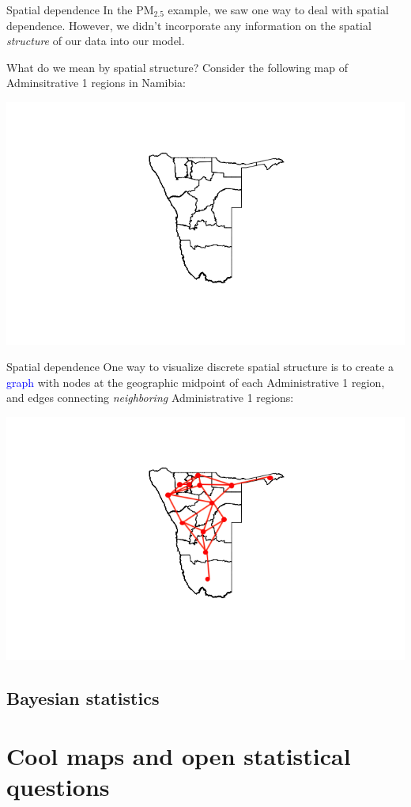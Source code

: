 \documentclass[10pt,t]{beamer}
\begin{document}
\begin{frame}{Spatial dependence}
In the $\text{PM}_{2.5}$ example, we saw one way to deal with spatial dependence. However, we didn't incorporate any information on the spatial \textit{structure} of our data into our model. 

\vspace{0.3cm}

What do we mean by spatial structure? Consider the following map of Adminsitrative 1
regions in Namibia:

\centering \includegraphics[scale=0.4]{namibia_admin1.png}

\end{frame}

\begin{frame}{Spatial dependence}
One way to visualize discrete spatial structure is to create a \textcolor{blue}{graph} with nodes at the geographic midpoint of each Administrative 1 region, and edges connecting \textit{neighboring} Administrative 1 regions:

\vspace{0.3cm}

\centering \includegraphics[scale=0.4]{namibia_admin1_2.png}

\end{frame}

\subsection{Bayesian statistics}

\section{Cool maps and open statistical questions}
\end{document}
